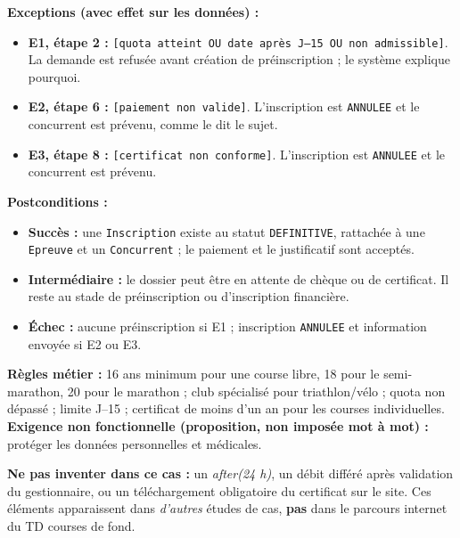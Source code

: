 \documentclass[10pt,a4paper]{article}
\begin{document}
\textbf{Exceptions (avec effet sur les données) :}
\begin{itemize}
\item \textbf{E1, étape 2 :} \texttt{[quota atteint OU date après J--15 OU non admissible]}. La demande est refusée avant création de préinscription ; le système explique pourquoi.
\item \textbf{E2, étape 6 :} \texttt{[paiement non valide]}. L'inscription est \texttt{ANNULEE} et le concurrent est prévenu, comme le dit le sujet.
\item \textbf{E3, étape 8 :} \texttt{[certificat non conforme]}. L'inscription est \texttt{ANNULEE} et le concurrent est prévenu.
\end{itemize}
\textbf{Postconditions :}
\begin{itemize}
\item \textbf{Succès :} une \texttt{Inscription} existe au statut \texttt{DEFINITIVE}, rattachée à une \texttt{Epreuve} et un \texttt{Concurrent} ; le paiement et le justificatif sont acceptés.
\item \textbf{Intermédiaire :} le dossier peut être en attente de chèque ou de certificat. Il reste au stade de préinscription ou d'inscription financière.
\item \textbf{Échec :} aucune préinscription si E1 ; inscription \texttt{ANNULEE} et information envoyée si E2 ou E3.
\end{itemize}
\textbf{Règles métier :} 16 ans minimum pour une course libre, 18 pour le semi-marathon, 20 pour le marathon ; club spécialisé pour triathlon/vélo ; quota non dépassé ; limite J--15 ; certificat de moins d'un an pour les courses individuelles. \textbf{Exigence non fonctionnelle (proposition, non imposée mot à mot) :} protéger les données personnelles et médicales.
\begin{warningbox}
\textbf{Ne pas inventer dans ce cas :} un \textit{after(24 h)}, un débit différé après validation du gestionnaire, ou un téléchargement obligatoire du certificat sur le site. Ces éléments apparaissent dans \emph{d'autres} études de cas, \textbf{pas} dans le parcours internet du TD courses de fond.
\end{warningbox}
\end{document}
